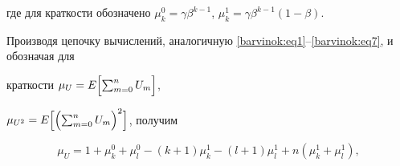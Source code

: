 где для краткости обозначено $\mu _k^0 =\gamma \beta ^{k-1}$, $\mu

_k^1 =\gamma \beta ^{k-1}(1-\beta)$.



Производя цепочку вычислений, аналогичную \eqref{barvinok:eq1}--\eqref{barvinok:eq7}, и обозначая для

краткости $\mu _U =E\Bigl[ \sum_{m=0}^n {U_m } \Bigr]$, 

$\mu _{U^2} =E \Bigl[ \Bigl( \sum_{m=0}^n {U_m } \Bigr)^2

\Bigr]$, получим

\begin{equation}

\label{barvinok:eq9}

 \mu _U =1+\mu _k^0 +\mu _l^0 - (k+1)\mu _k^1 - (l+1)\mu _l^1 +n (\mu _k^1

+\mu _l^1),

\end{equation}



\vspace{-5mm}



